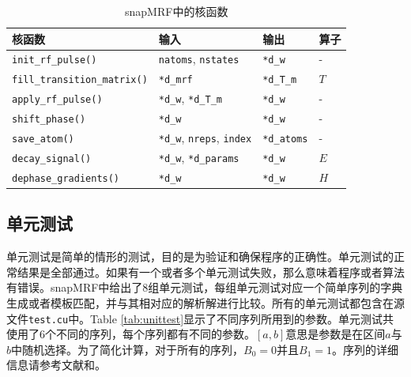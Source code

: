 \begin{table}
\centering
\caption{snapMRF中的核函数}
\begin{center}
\begin{tabular}{|l|l|l|l|}
\hline
\hline
核函数 & 输入 & 输出 & 算子\\
\hline
\texttt{init\_rf\_pulse()} & \texttt{natoms}, \texttt{nstates} & \texttt{*d\_w} & - \\
\hline
\texttt{fill\_transition\_matrix()} & \texttt{*d\_mrf} & \texttt{*d\_T\_m} & $T$ \\
\hline
\texttt{apply\_rf\_pulse()} & \texttt{*d\_w}, \texttt{*d\_T\_m} & \texttt{*d\_w} & - \\
\hline
\texttt{shift\_phase()} & \texttt{*d\_w} & \texttt{*d\_w} & - \\
\hline
\texttt{save\_atom()} & \texttt{*d\_w}, \texttt{nreps}, \texttt{index} & \texttt{*d\_atoms} & - \\
\hline
\texttt{decay\_signal()} & \texttt{*d\_w}, \texttt{*d\_params} & \texttt{*d\_w}  & $E$ \\
\hline
\texttt{dephase\_gradients()} & \texttt{*d\_w} & \texttt{*d\_w} & $H$ \\
\hline
\end{tabular}
\end{center}
\label{tab:kernel}
\end{table}

\subsection{单元测试}
单元测试是简单的情形的测试，目的是为验证和确保程序的正确性。单元测试的正常结果是全部通过。如果有一个或者多个单元测试失败，那么意味着程序或者算法有错误。snapMRF中给出了8组单元测试，每组单元测试对应一个简单序列的字典生成或者模板匹配，并与其相对应的解析解进行比较。所有的单元测试都包含在源文件\texttt{test.cu}中。Table \ref{tab:unittest}显示了不同序列所用到的参数。单元测试共使用了6个不同的序列，每个序列都有不同的参数。$[a,b]$意思是参数是在区间$a$与$b$中随机选择。为了简化计算，对于所有的序列，$B_0=0$并且$B_1=1$。序列的详细信息请参考文献\cite{weigel}和\cite{web}。

